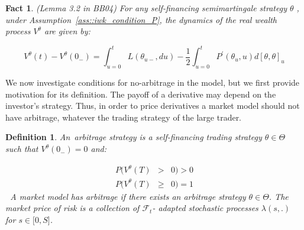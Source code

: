 \documentclass{article}
\newtheorem{definition}{Definition}
\newtheorem{fact}[theorem]{Fact}
\begin{document}


\begin{fact}
(Lemma 3.2 in BB04) For any self-financing semimartingale strategy $\theta $%
, under Assumption~\ref{ass::iwk_condition_P}, the dynamics of the real
wealth process $V^{\theta }$ are given by:
\end{fact}

\begin{equation}
V^{\theta }(t)-V^{\theta }(0_{-})=\int_{u=0}^{t}L(\theta _{u-},du)-\frac{1}{2}%
\int_{u=0}^{t}P^{\prime }(\theta _{u},u)d[\theta ,\theta ]_{u}
\label{lemma32BB04}
\end{equation}%
\bigskip

We now investigate conditions for no-arbitrage in the model, but we first
provide motivation for its definition. The payoff of a derivative may depend
on the investor's strategy. Thus, in order to price derivatives a market
model should not have arbitrage, whatever the trading strategy of the large
trader.

\bigskip


\begin{definition}
An\textit{\ arbitrage strategy} is a self-financing trading strategy $\theta
\in \Theta $ such that $V^{\theta }(0_{-})=0$ and:

\begin{eqnarray*}
P(V^{\theta }(T) &>&0)>0 \\
P(V^{\theta }(T) &\geq &0)=1
\end{eqnarray*}%
\bigskip \textbf{\ }A \textit{market model has arbitrage} if there exists an
arbitrage strategy $\theta \in \Theta $. The \textit{market price of risk}
is a collection of $\mathcal{F}_{t}$- adapted stochastic processes $\lambda
(s,.)$ for $s\in \lbrack 0,S]$.
\end{definition}


\end{document}

